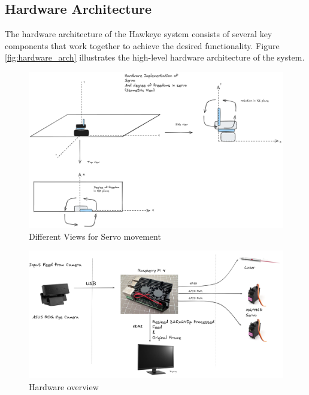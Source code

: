 \documentclass[a4paper,11pt]{article}%
\begin{document}
\subsection{Hardware Architecture}
The hardware architecture of the Hawkeye system consists of several key components that work together to achieve the desired functionality. Figure \ref{fig:hardware_arch} illustrates the high-level hardware architecture of the system.

\begin{figure}[H]
    \centering
    \includegraphics[scale=0.27]{figures/isometric.png}
    \caption{Different Views for Servo movement}
\end{figure}

\begin{figure}[H]
    \centering
    \includegraphics[scale=0.1]{figures/hw_overview.png}
    \caption{Hardware overview}
\end{figure}
\end{document}
